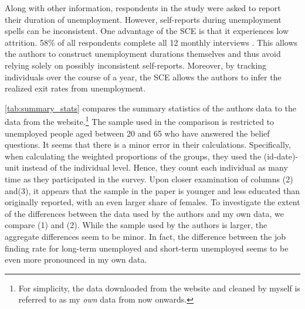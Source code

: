 \documentclass[11pt,a4paper,leqno]{article}
\begin{document}
Along with other information, respondents in the study were asked to report their duration of unemployment. However, self-reports during unemployment spells can be inconsistent.
 One advantage of the SCE is that it experiences low attrition. 58\% of all respondents complete all 12 monthly interviews \parencite{SCEOverview}. This allows the authors to construct unemployment durations themselves and thus avoid relying solely on possibly inconsistent self-reports.  Moreover, by tracking individuals over the course of a year, the SCE allows the authors to infer the realized exit rates from unemployment. 
 
     \begin{table}[!htbp] 
 	\centering 
 	\caption{Summary Statistics} 
 	\label{tab:summary_stats} 
 	
 	\begin{minipage}[center]{0.7\textwidth}
 		\caption*{\footnotesize \textbf{Notes:} Survey weights are used for all calculations. (3) replicates the reported statistics from the paper exactly. (2) corrects for the error reported in the text and (1) is displaying the summary statistics for the SCE sample.}
 	\end{minipage}
 \end{table}
 
 \autoref{tab:summary_stats} compares the summary statistics of the authors data to the data from the website.\footnote{
 	For simplicity, the data downloaded from the website and cleaned by myself is referred to as my \textit{own} data from now onwards. }  The sample used in the comparison is restricted to unemployed people aged between 20 and 65 who have answered the belief questions. 
 It seems that there is a minor error in their calculations. Specifically, when calculating the weighted proportions of the groups, they used the (id-date)-unit instead of the individual level. Hence, they count each individual as many time as they participated in the survey. Upon closer examination of columns (2) and(3), it appears that the sample in the paper is younger and less educated than originally reported, with an even larger share of females. To investigate the extent of the differences between the data used by the authors and my own data, we compare (1) and (2). While the sample used by the authors is larger, the aggregate differences seem to be minor. In fact, the difference between the job finding rate for long-term unemployed and short-term unemployed seems to be even more pronounced in my own data.  
\end{document}
